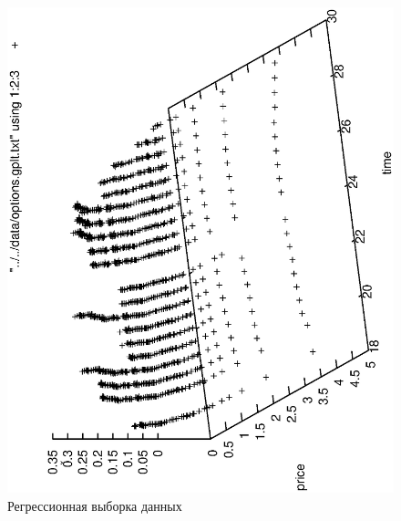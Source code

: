 \documentclass[12pt,a4paper]{amsart}
\begin{document}
\begin{figure}[h]
  \includegraphics[scale=0.75,angle=-90]{figs/raw_data_1.eps}
  \caption{Регрессионная выборка данных}
  \label{fig:raw_data_1}
\end{figure}
\end{document}
